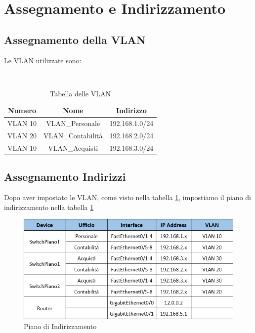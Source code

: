 \documentclass[12pt]{article}
\begin{document}
    \newpage
    \section{Assegnamento e Indirizzamento}

    \subsection{Assegnamento della VLAN}
    Le VLAN utilizzate sono:
        \begin{table}[h!]
            \centering
            \caption{Tabella delle VLAN}
            ~ \\
            \begin{tabular}{|c|c|c|}
                \hline
                \cellcolor{babyblue} \textbf{Numero} & \cellcolor{babyblue} \textbf{Nome} & \cellcolor{babyblue} \textbf{Indirizzo} \\
                \hline
                VLAN 10 & VLAN\_Personale & 192.168.1.0/24 \\ 
                \hline
                VLAN 20 & VLAN\_Contabilità & 192.168.2.0/24 \\ 
                \hline
                VLAN 10 & VLAN\_Acquisti & 192.168.3.0/24 \\ 
                \hline
            \end{tabular}
        \label{tab:TabellaVLAN}
        \end{table}

    \subsection{Assegnamento Indirizzi}
    \noindent Dopo aver impostato le VLAN, come visto nella tabella \ref*{tab:TabellaVLAN}, impostiamo il piano di indirizzamento nella tabella \ref*{tab:indirizzamento} 
        \begin{figure}[h!]
            \begin{center}
                \label{tab:indirizzamento}
                \caption{Piano di Indirizzamento}
                \includegraphics[width = 15cm]{Assets/TabellaIndirizzi.png}
            \end{center}
        \end{figure}
\end{document}
